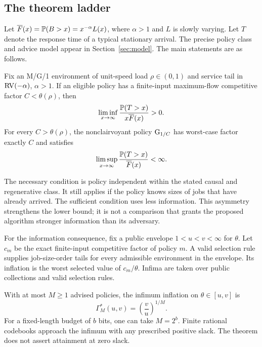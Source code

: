 \subsection{The theorem ladder}
Let $\overline F(x)=\mathbb P(B>x)=x^{-\alpha}L(x)$, where $\alpha>1$ and $L$ is slowly varying. Let $T$ denote the response time of a typical stationary arrival. The precise policy class and advice model appear in Section~\ref{sec:model}. The main statements are as follows.

\begin{theorem}\label{thm:boundary-intro}
Fix an M/G/1 environment of unit-speed load $\rho\in(0,1)$ and service tail in $\operatorname{RV}(-\alpha)$, $\alpha>1$.
If an eligible policy has a finite-input maximum-flow competitive factor $C<\theta(\rho)$, then
\begin{equation}\label{eq:lower-intro}
 \liminf_{x\to\infty}\frac{\mathbb P(T>x)}{x\overline F(x)}>0.
\end{equation}
For every $C>\theta(\rho)$, the nonclairvoyant policy $\operatorname{G}_{1/C}$ has worst-case factor exactly $C$ and satisfies
\begin{equation}\label{eq:upper-intro}
 \limsup_{x\to\infty}\frac{\mathbb P(T>x)}{\overline F(x)}<\infty.
\end{equation}
\end{theorem}

The necessary condition is policy independent within the stated causal and regenerative class. It still applies if the policy knows sizes of jobs that have already arrived. The sufficient condition uses less information. This asymmetry strengthens the lower bound; it is not a comparison that grants the proposed algorithm stronger information than its adversary.

For the information consequence, fix a public envelope $1<u<v<\infty$ for $\theta$. Let $c_m$ be the exact finite-input competitive factor of policy $m$. A valid selection rule supplies job-size-order tails for every admissible environment in the envelope. Its inflation is the worst selected value of $c_m/\theta$. Infima are taken over public collections and valid selection rules.

\begin{theorem}\label{thm:advice-intro}
With at most $M\geq1$ advised policies, the infimum inflation on $\theta\in[u,v]$ is
\begin{equation}\label{eq:advice-intro}
 \Gamma_M^*(u,v)=\left(\frac vu\right)^{1/M}.
\end{equation}
For a fixed-length budget of $b$ bits, one can take $M=2^b$. Finite rational codebooks approach the infimum with any prescribed positive slack. The theorem does not assert attainment at zero slack.
\end{theorem}

